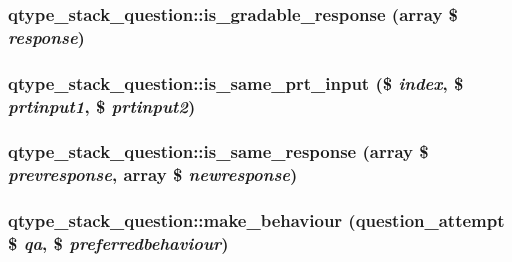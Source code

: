 \label{classqtype__stack__question_ab80c2c47f43a1058c3e161c3f2cf424a}
\hypertarget{classqtype__stack__question_a8c49225da011449411661e2bdc698c43}{
\subsubsection[{is\_\-gradable\_\-response}]{\setlength{\rightskip}{0pt plus 5cm}qtype\_\-stack\_\-question::is\_\-gradable\_\-response (array \$ {\em response})}}
\label{classqtype__stack__question_a8c49225da011449411661e2bdc698c43}
\hypertarget{classqtype__stack__question_a815171df1880921d538f15888eff0ba4}{
\subsubsection[{is\_\-same\_\-prt\_\-input}]{\setlength{\rightskip}{0pt plus 5cm}qtype\_\-stack\_\-question::is\_\-same\_\-prt\_\-input (\$ {\em index}, \/  \$ {\em prtinput1}, \/  \$ {\em prtinput2})}}
\label{classqtype__stack__question_a815171df1880921d538f15888eff0ba4}
\hypertarget{classqtype__stack__question_abcb27429946edeb99bcd4706c49f4c4b}{
\subsubsection[{is\_\-same\_\-response}]{\setlength{\rightskip}{0pt plus 5cm}qtype\_\-stack\_\-question::is\_\-same\_\-response (array \$ {\em prevresponse}, \/  array \$ {\em newresponse})}}
\label{classqtype__stack__question_abcb27429946edeb99bcd4706c49f4c4b}
\hypertarget{classqtype__stack__question_a6710a5a63ad311ca3c87618ffad2cb95}{
\subsubsection[{make\_\-behaviour}]{\setlength{\rightskip}{0pt plus 5cm}qtype\_\-stack\_\-question::make\_\-behaviour (question\_\-attempt \$ {\em qa}, \/  \$ {\em preferredbehaviour})}}
